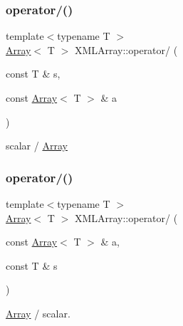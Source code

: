 \subsubsection{\texorpdfstring{operator/()}{operator/()}\hspace{0.1cm}{\footnotesize\ttfamily [3/4]}}
{\footnotesize\ttfamily template$<$typename T $>$ \\
\mbox{\hyperlink{classXMLArray_1_1Array}{Array}}$<$ T $>$ X\+M\+L\+Array\+::operator/ (\begin{DoxyParamCaption}\item[{const T \&}]{s,  }\item[{const \mbox{\hyperlink{classXMLArray_1_1Array}{Array}}$<$ T $>$ \&}]{a }\end{DoxyParamCaption})\hspace{0.3cm}{\ttfamily [inline]}}



scalar / \mbox{\hyperlink{classXMLArray_1_1Array}{Array}} 

\mbox{\label{namespaceXMLArray_a719499a85d182af00fc9ecd23c8928e0}} 
\subsubsection{\texorpdfstring{operator/()}{operator/()}\hspace{0.1cm}{\footnotesize\ttfamily [4/4]}}
{\footnotesize\ttfamily template$<$typename T $>$ \\
\mbox{\hyperlink{classXMLArray_1_1Array}{Array}}$<$ T $>$ X\+M\+L\+Array\+::operator/ (\begin{DoxyParamCaption}\item[{const \mbox{\hyperlink{classXMLArray_1_1Array}{Array}}$<$ T $>$ \&}]{a,  }\item[{const T \&}]{s }\end{DoxyParamCaption})\hspace{0.3cm}{\ttfamily [inline]}}



\mbox{\hyperlink{classXMLArray_1_1Array}{Array}} / scalar. 

\mbox{\label{namespaceXMLArray_a6cdc9d50a3fbbd96cfbbef4bbaf78fa4}} 
